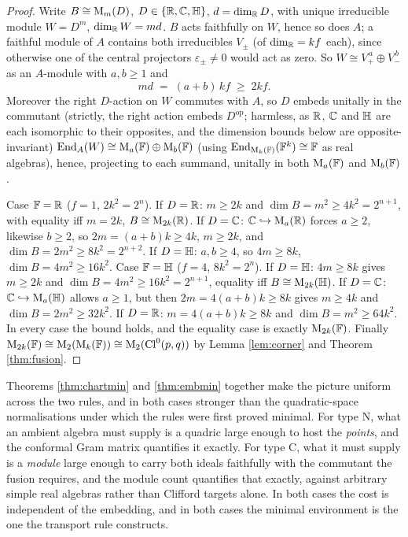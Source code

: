\begin{proof}
Write $B \cong \mathrm{M}_m(D)$, $D \in \{\mathbb{R}, \mathbb{C}, \mathbb{H}\}$, $d = \dim_{\mathbb{R}} D$, with unique irreducible module $W = D^m$, $\dim_{\mathbb{R}} W = md$. $B$ acts faithfully on $W$, hence so does $A$; a faithful module of $A$ contains both irreducibles $V_\pm$ (of $\dim_{\mathbb{R}} = kf$ each), since otherwise one of the central projectors $\varepsilon_\pm \neq 0$ would act as zero. So $W \cong V_+^{\,a} \oplus V_-^{\,b}$ as an $A$-module with $a, b \geq 1$ and
\[
md \;=\; (a + b)\,k f \;\geq\; 2kf .
\]
Moreover the right $D$-action on $W$ commutes with $A$, so $D$ embeds unitally in the commutant (strictly, the right action embeds $D^{\mathrm{op}}$; harmless, as $\mathbb{R}$, $\mathbb{C}$ and $\mathbb{H}$ are each isomorphic to their opposites, and the dimension bounds below are opposite-invariant) $\mathrm{End}_A(W) \cong \mathrm{M}_a(\mathbb{F}) \oplus \mathrm{M}_b(\mathbb{F})$ (using $\mathrm{End}_{\mathrm{M}_k(\mathbb{F})}(\mathbb{F}^k) \cong \mathbb{F}$ as real algebras), hence, projecting to each summand, unitally in both $\mathrm{M}_a(\mathbb{F})$ and $\mathrm{M}_b(\mathbb{F})$.

Case $\mathbb{F} = \mathbb{R}$ ($f = 1$, $2k^2 = 2^n$). If $D = \mathbb{R}$: $m \geq 2k$ and $\dim B = m^2 \geq 4k^2 = 2^{n+1}$, with equality iff $m = 2k$, $B \cong \mathrm{M}_{2k}(\mathbb{R})$. If $D = \mathbb{C}$: $\mathbb{C} \hookrightarrow \mathrm{M}_a(\mathbb{R})$ forces $a \geq 2$, likewise $b \geq 2$, so $2m = (a+b)k \geq 4k$, $m \geq 2k$, and $\dim B = 2m^2 \geq 8k^2 = 2^{n+2}$. If $D = \mathbb{H}$: $a, b \geq 4$, so $4m \geq 8k$, $\dim B = 4m^2 \geq 16k^2$. Case $\mathbb{F} = \mathbb{H}$ ($f = 4$, $8k^2 = 2^n$). If $D = \mathbb{H}$: $4m \geq 8k$ gives $m \geq 2k$ and $\dim B = 4m^2 \geq 16k^2 = 2^{n+1}$, equality iff $B \cong \mathrm{M}_{2k}(\mathbb{H})$. If $D = \mathbb{C}$: $\mathbb{C} \hookrightarrow \mathrm{M}_a(\mathbb{H})$ allows $a \geq 1$, but then $2m = 4(a+b)k \geq 8k$ gives $m \geq 4k$ and $\dim B = 2m^2 \geq 32k^2$. If $D = \mathbb{R}$: $m = 4(a+b)k \geq 8k$ and $\dim B = m^2 \geq 64k^2$. In every case the bound holds, and the equality case is exactly $\mathrm{M}_{2k}(\mathbb{F})$. Finally $\mathrm{M}_{2k}(\mathbb{F}) \cong \mathrm{M}_2(\mathrm{M}_k(\mathbb{F})) \cong \mathrm{M}_2(\mathrm{Cl}^0(p,q))$ by Lemma \ref{lem:corner} and Theorem \ref{thm:fusion}.
\end{proof}

\begin{remark}\label{rem:scopedischarged}
Theorems \ref{thm:chartmin} and \ref{thm:embmin} together make the picture uniform across the two rules, and in both cases stronger than the quadratic-space normalisations under which the rules were first proved minimal. For type N, what an ambient algebra must supply is a quadric large enough to host the \emph{points}, and the conformal Gram matrix quantifies it exactly. For type C, what it must supply is a \emph{module} large enough to carry both ideals faithfully with the commutant the fusion requires, and the module count quantifies that exactly, against arbitrary simple real algebras rather than Clifford targets alone. In both cases the cost is independent of the embedding, and in both cases the minimal environment is the one the transport rule constructs.
\end{remark}


